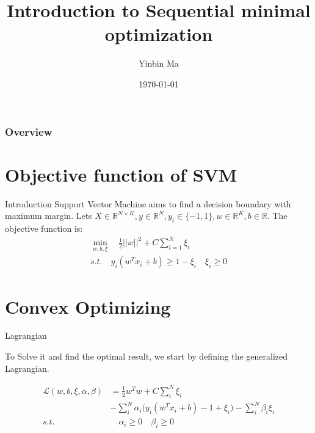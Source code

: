 \documentclass{beamer}
\title[Short title]{Introduction to Sequential minimal optimization} %
\author{Yinbin Ma} %
\institute[UC Riverside] %
{
University of Illinois at Chicago \\ %
\medskip
}
\date{\today} %
\begin{document}
\begin{frame}
\titlepage %
\end{frame}

\begin{frame}
\frametitle{Overview} %
\tableofcontents %
\end{frame}



\section{Objective function of SVM}
\begin{frame}{Introduction}
Support Vector Machine aims to find a decision boundary with maximum margin. Lets $ X \in \mathbb{R}^{N\times K}, y \in \mathbb{R}^N, y_i \in \{-1, 1\}, w \in \mathbb{R}^K, b \in \mathbb{R}$. The objective function is:
\begin{gather*}
\min_{w, b, \xi} \quad \frac{1}{2}||w||^2 + C \sum_{i=1}^N{\xi_i} \\
s.t. \quad y_i(w^T x_i + b) \geq 1 - \xi_i \quad \xi_i \geq 0
\end{gather*}
\end{frame}

\section{Convex Optimizing}
\begin{frame}{Lagrangian}

To Solve it and find the optimal result, we start by defining the generalized Lagrangian.

\begin{align*}
\mathcal{L}(w, b, \xi, \alpha, \beta) &= \frac{1}{2}w^T w+C\sum_i^N{\xi_i} \\ &-\sum_i^N{\alpha_i \biggl( y_i (w^T x_i + b) - 1 + \xi_i \biggr)} - \sum_i^N{\beta_i \xi_i} \\
s.t. &\quad \alpha_i \geq 0 \quad \beta_i \geq 0
\end{align*}
\end{frame}
\end{document}
